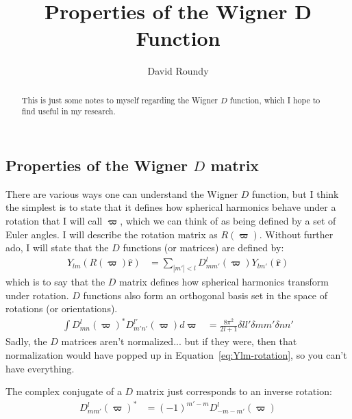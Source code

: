 \documentclass[letterpaper,twocolumn,amsmath,amssymb,pre]{revtex4-1}
\begin{document}
\title{Properties of the Wigner D Function}

\author{David Roundy}
\begin{abstract}
  This is just some notes to myself regarding the Wigner $D$ function,
  which I hope to find useful in my research.
\end{abstract}

\newcommand\rot{\ensuremath{\mathbf{\varpi}}}
\newcommand\rhat{\ensuremath{\mathbf{\hat{r}}}}
\newcommand\solidangle{\ensuremath{\Omega}}

\maketitle

\subsection{Properties of the Wigner $D$ matrix}

There are various ways one can understand the Wigner $D$ function, but
I think the simplest is to state that it defines how spherical
harmonics behave under a rotation that I will call $\rot$, which we
can think of as being defined by a set of Euler angles.  I will
describe the rotation matrix as $R(\rot)$.  Without further ado, I
will state that the $D$ functions (or matrices) are defined by:
\begin{align}\label{eq:Ylm-rotation}
  Y_{lm}(R(\rot)\rhat) &= \sum_{|m'|<l} D^{l}_{mm'}(\rot) Y_{lm'}(\rhat)
\end{align}
which is to say that the $D$ matrix defines how spherical harmonics
transform under rotation.  $D$ functions also form an orthogonal basis
set in the space of rotations (or orientations).
\begin{align}
  \int D^{l}_{mn}(\rot)^{*}D^{l'}_{m'n'}(\rot) d\rot
  &= \frac{8\pi^2}{2l+1}\delta{ll'}\delta{mm'}\delta{nn'}
\end{align}
Sadly, the $D$ matrices aren't normalized... but if they were, then
that normalization would have popped up in
Equation~\ref{eq:Ylm-rotation}, so you can't have everything.

The complex conjugate of a $D$ matrix just corresponds to an inverse
rotation:
\begin{align}
  D^{l}_{mm'}(\rot)^{*} &= (-1)^{m'-m}D^{l}_{-m-m'}(\rot)
\end{align}
\end{document}
